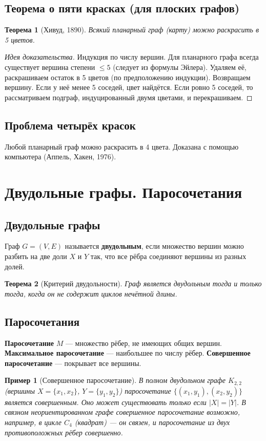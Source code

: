 \documentclass[12pt]{article}
\newtheorem{theorem}{Теорема}
\newtheorem{example}{Пример}
\begin{document}
\begin{enumerate}
\subsection{Теорема о пяти красках (для плоских графов)}
\begin{theorem}[Хивуд, 1890]
    Всякий планарный граф (карту) можно раскрасить в 5 цветов.
\end{theorem}
\begin{proof}[Идея доказательства]
    Индукция по числу вершин. Для планарного графа всегда существует вершина степени \(\le 5\) (следует из формулы Эйлера). Удаляем её, раскрашиваем остаток в 5 цветов (по предположению индукции). Возвращаем вершину. Если у неё менее 5 соседей, цвет найдётся. Если ровно 5 соседей, то рассматриваем подграф, индуцированный двумя цветами, и перекрашиваем.
\end{proof}

\subsection{Проблема четырёх красок}
Любой планарный граф можно раскрасить в 4 цвета. Доказана с помощью компьютера (Аппель, Хакен, 1976).

\section{Двудольные графы. Паросочетания}
\subsection{Двудольные графы}
Граф \(G = (V,E)\) называется \textbf{двудольным}, если множество вершин можно разбить на две доли \(X\) и \(Y\) так, что все рёбра соединяют вершины из разных долей.

\begin{theorem}[Критерий двудольности]
    Граф является двудольным тогда и только тогда, когда он не содержит циклов нечётной длины.
\end{theorem}

\subsection{Паросочетания}
\textbf{Паросочетание} \(M\) — множество рёбер, не имеющих общих вершин. \textbf{Максимальное паросочетание} — наибольшее по числу рёбер. \textbf{Совершенное паросочетание} — покрывает все вершины.

\begin{example}[Совершенное паросочетание]
    В полном двудольном графе \(K_{2,2}\) (вершины \(X=\{x_1,x_2\}\), \(Y=\{y_1,y_2\}\)) паросочетание \(\{(x_1,y_1), (x_2,y_2)\}\) является совершенным. Оно может существовать только если \(|X|=|Y|\). В связном неориентированном графе совершенное паросочетание возможно, например, в цикле \(C_4\) (квадрат) — он связен, и паросочетание из двух противоположных рёбер совершенно.
\end{example}


\end{enumerate}
\end{document}
